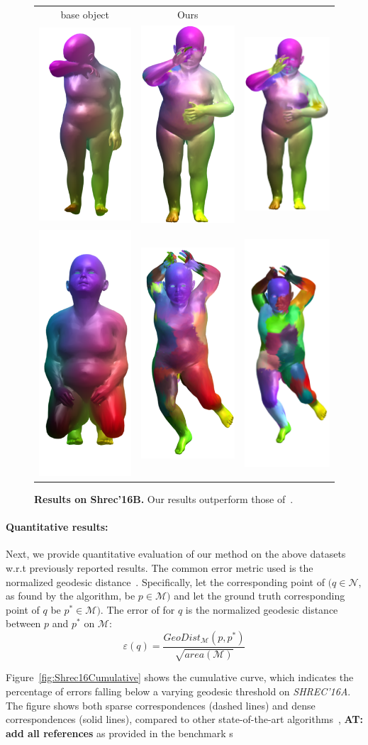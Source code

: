 \documentclass[10pt,twocolumn,letterpaper]{article}
\newcommand{\colornote}[3]{{\color{#1}\bf{#2: #3}\normalfont}}
\newcommand{\colornote}[3]{}
\newcommand {\ayellet}[1]{\colornote{blue}{AT}{#1}}
\begin{document}
\begin{figure}[htb]

	\centering
	\begin{tabular}{ccc}
	    base object & Ours & \cite{rodola2017partial}  
	    \\
	    	\includegraphics[scale=0.5]{figures/Top1Base.png} & \includegraphics[scale=0.5]{figures/Top1DDIS.png} & \includegraphics[scale=0.5]{figures/Top1PFM.png} \\ \includegraphics[scale=0.5]{figures/Top2Base.png} & \includegraphics[scale=0.5]{figures/Top2DDIS.png} & \includegraphics[scale=0.5]{figures/Top2PFM.png}
	\end{tabular}

	\caption{{\bf Results on Shrec'16B.} 
	Our results outperform those of~\cite{rodola2017partial}.}
	\label{fig:Shrec16TopImage}
\end{figure}



\paragraph{Quantitative results:}
Next, we provide quantitative evaluation of our method on the above datasets w.r.t previously reported results.
The common error metric used is the normalized geodesic distance~\cite{kim2011blended}.
Specifically, let the corresponding point of $(q \in \mathcal{N}$, as found by the algorithm, be $ p \in \mathcal{M})$ and let the ground truth corresponding point of $q$ be $p^* \in \mathcal{M})$. 
The error of for $q$ is the normalized geodesic distance between  $p$ and $p^*$ on $\mathcal{M}$:
\begin{equation}
\varepsilon(q)=\frac{GeoDist_{\mathcal{M}}(p,p^*)}{\sqrt{area(\mathcal{M})}}
\end{equation}

Figure~\ref{fig:Shrec16Cumulative} shows the cumulative curve, which indicates the percentage of errors falling below a varying geodesic threshold on {\em SHREC'16A}. 
The figure shows both sparse correspondences (dashed lines) and dense correspondences (solid lines), compared to other state-of-the-art algorithms~\cite{litany2017fully,rodola2017partial},
\ayellet{add all references}
as provided in the benchmark s
\end{document}
